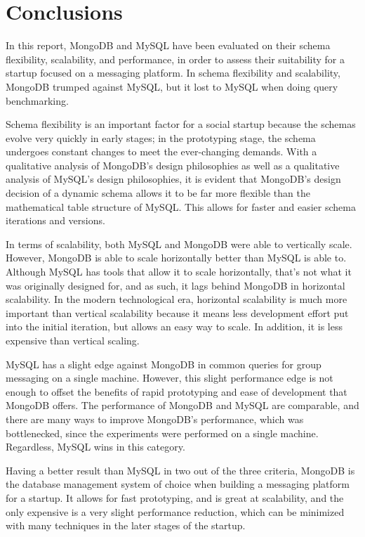 \documentclass[12pt]{article}
\begin{document}
\section{Conclusions}
In this report, MongoDB and MySQL have been evaluated on their schema flexibility, scalability, and performance, in order to assess their suitability for a startup focused on a messaging platform. In schema flexibility and scalability, MongoDB trumped against MySQL, but it lost to MySQL when doing query benchmarking. 

Schema flexibility is an important factor for a social startup because the schemas evolve very quickly in early stages; in the prototyping stage, the schema undergoes constant changes to meet the ever-changing demands. With a qualitative analysis of MongoDB's design philosophies as well as a qualitative analysis of MySQL's design philosophies, it is evident that MongoDB's design decision of a dynamic schema allows it to be far more flexible than the mathematical table structure of MySQL. This allows for faster and easier schema iterations and versions.

In terms of scalability, both MySQL and MongoDB were able to vertically scale. However, MongoDB is able to scale horizontally better than MySQL is able to. Although MySQL has tools that allow it to scale horizontally, that's not what it was originally designed for, and as such, it lags behind MongoDB in horizontal scalability. In the modern technological era, horizontal scalability is much more important than vertical scalability because it means less development effort put into the initial iteration, but allows an easy way to scale. In addition, it is less expensive than vertical scaling.

MySQL has a slight edge against MongoDB in common queries for group messaging on a single machine. However, this slight performance edge is not enough to offset the benefits of rapid prototyping and ease of development that MongoDB offers. The performance of MongoDB and MySQL are comparable, and there are many ways to improve MongoDB's performance, which was bottlenecked, since the experiments were performed on a single machine. Regardless, MySQL wins in this category.

Having a better result than MySQL in two out of the three criteria, MongoDB is the database management system of choice when building a messaging platform for a startup. It allows for fast prototyping, and is great at scalability, and the only expensive is a very slight performance reduction, which can be minimized with many techniques in the later stages of the startup.
\end{document}
